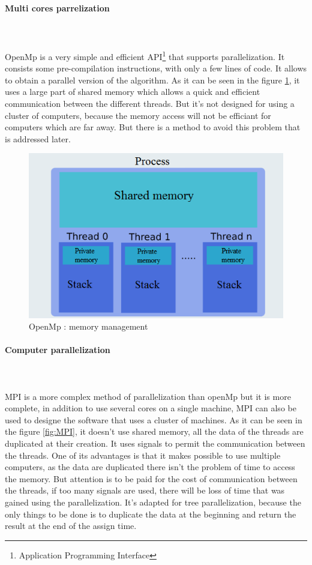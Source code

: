 \paragraph{Multi cores parrelization}\mbox{}\\\mbox{}\\
	OpenMp is a very simple and efficient API\footnote{Application Programming Interface} that supports parallelization. It consists some pre-compilation instructions, with only a few lines of code. It allows to obtain a parallel version of the algorithm. As it can be seen in the figure \ref{fig:OpenMp}, it uses a large part of shared memory which allows a quick and efficient communication between the different threads. But it's not designed for using a cluster of computers, because the memory access will not be efficiant for computers which are far away. But there is a method to avoid this problem that is addressed later.
\begin{figure}[!h] 
\centerline{\includegraphics[scale=0.50]{3_Software_considered/MultithreadingMP_boost_Visual_MPI_5000_Zotero_Project_Baptiste/OpenMP}}
   \caption{\label{étiquette} OpenMp : memory management}
\label{fig:OpenMp}
\end{figure}
\newpage
\paragraph{Computer parallelization}\mbox{}\\\mbox{}\\

	MPI is a more complex method of parallelization than openMp but it is more complete, in addition to use several cores on a single machine, MPI can also be used  to designe the software that uses a cluster of machines. As it can be seen in the figure \ref{fig:MPI}, it doesn't use shared memory, all the data of the threads are duplicated at their creation. It uses signals to permit the communication between the threads. One of its advantages is that it makes possible to use multiple computers, as the data are duplicated there isn't the problem of time to access the memory. But attention is to be paid for the cost of communication between the threads, if  too many  signals are used, there will be loss of time that was gained using the parallelization. It's  adapted for  tree parallelization, because the only things to be done is to duplicate the data at the beginning and return the result at the end of the assign time.

